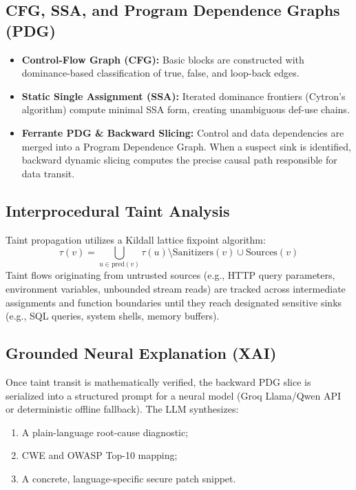 \documentclass[10pt,conference]{IEEEtran}
\begin{document}
\subsection{CFG, SSA, and Program Dependence Graphs (PDG)}
\begin{itemize}
    \item \textbf{Control-Flow Graph (CFG):} Basic blocks are constructed with dominance-based classification of true, false, and loop-back edges.
    \item \textbf{Static Single Assignment (SSA):} Iterated dominance frontiers (Cytron's algorithm) compute minimal SSA form, creating unambiguous def-use chains.
    \item \textbf{Ferrante PDG \& Backward Slicing:} Control and data dependencies are merged into a Program Dependence Graph. When a suspect sink is identified, backward dynamic slicing computes the precise causal path responsible for data transit.
\end{itemize}

\subsection{Interprocedural Taint Analysis}
Taint propagation utilizes a Kildall lattice fixpoint algorithm:
\begin{equation}
\tau(v) = \bigcup_{u \in \text{pred}(v)} \tau(u) \setminus \text{Sanitizers}(v) \cup \text{Sources}(v)
\end{equation}
Taint flows originating from untrusted sources (e.g., HTTP query parameters, environment variables, unbounded stream reads) are tracked across intermediate assignments and function boundaries until they reach designated sensitive sinks (e.g., SQL queries, system shells, memory buffers).

\subsection{Grounded Neural Explanation (XAI)}
Once taint transit is mathematically verified, the backward PDG slice is serialized into a structured prompt for a neural model (Groq Llama/Qwen API or deterministic offline fallback). The LLM synthesizes:
\begin{enumerate}
    \item A plain-language root-cause diagnostic;
    \item CWE and OWASP Top-10 mapping;
    \item A concrete, language-specific secure patch snippet.
\end{enumerate}
\end{document}
